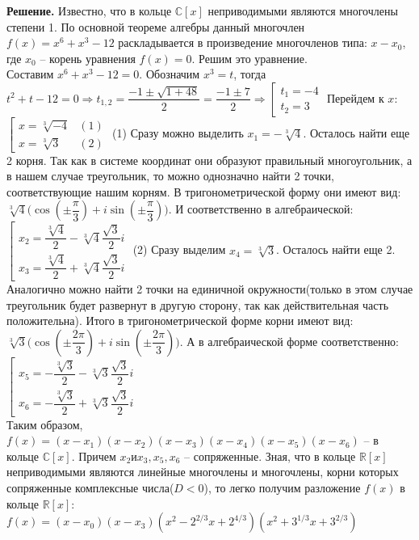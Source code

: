 \documentclass[a4paper, 12pt]{article}
\newcommand{\R}{\mathbb{R}}
\newcommand{\Co}{\mathbb{C}}
\begin{document}
\begin{spacing}{1}
\noindent \textbf{Решение.} Известно, что в кольце $\Co[x]$ неприводимыми являются многочлены степени 1. По основной теореме алгебры данный многочлен $f(x) = x^6 + x^3 - 12$ раскладывается в произведение многочленов типа: $x-x_0$, где $x_0$ -- корень уравнения $f(x) = 0$. Решим это уравнение. \\
Составим $x^6 + x^3 - 12 = 0$. Обозначим $x^3 = t$, тогда $t^2 + t - 12 = 0 \Rightarrow t_{1,2} = \dfrac{-1 \pm \sqrt{1 + 48}}{2} = \dfrac{-1 \pm 7}{2} \Rightarrow \left[\begin{array}{l|}
	t_1 = -4\\
	t_2 = 3
\end{array}\right.
$ Перейдем к $x$: $\left[\begin{array}{ll|}
	x = \sqrt[3]{-4} & (1)\\
	x = \sqrt[3]{3} & (2)
\end{array}\right.$ (1) Сразу можно выделить $x_1 = -\sqrt[3]{4}$. Осталось найти еще 2 корня. Так как в системе координат они образуют правильный многоугольник, а в нашем случае треугольник, то можно однозначно найти 2 точки, соответствующие нашим корням. В тригонометрической форму они имеют вид: $\sqrt[3]4\big(\cos(\pm\dfrac{\pi}{3})+i\sin(\pm\dfrac{\pi}{3})\big)$. И соответственно в алгебраической: $\left[\begin{array}{l|}
x_2 = \dfrac{\sqrt[3]4}{2} - \sqrt[3]4\dfrac{\sqrt3}{2}i\\[7pt]
x_3 = \dfrac{\sqrt[3]4}{2} + \sqrt[3]4\dfrac{\sqrt3}{2}i
\end{array}\right.$ (2) Сразу выделим $x_4 = \sqrt[3]{3}$. Осталось найти еще 2. Аналогично можно найти 2 точки на единичной окружности(только в этом случае треугольник будет развернут в другую сторону, так как действительная часть положительна). Итого в тригонометрической форме корни имеют вид: $\sqrt[3]3\big(\cos(\pm \dfrac{2\pi}{3}) + i\sin(\pm \dfrac{2\pi}{3})\big)$. А в алгебраической форме соответственно:$\left[\begin{array}{l}
x_5 = -\dfrac{\sqrt[3]3}{2} - \sqrt[3]3\dfrac{\sqrt3}{2}i\\[7pt]
x_6 = -\dfrac{\sqrt[3]3}{2} + \sqrt[3]3\dfrac{\sqrt3}{2}i
\end{array}\right.$ \\
Таким образом, $f(x) = (x-x_1)(x-x_2)(x-x_3)(x-x_4)(x-x_5)(x-x_6)$ -- в кольце $\Co[x]$. Причем $x_2 и x_3, x_5,x_6$ -- сопряженные. Зная, что в кольце $\R[x]$ неприводимыми являются линейные многочлены и многочлены, корни которых сопряженные комплексные числа($D < 0$), то легко получим разложение $f(x)$ в кольце $\R[x]$: $f(x) = (x - x_0)(x-x_3)(x^2 - 2^{2/3} x + 2^{4/3})(x^2 + 3^{1/3}x + 3^{2/3})$  







\end{spacing}
\end{document}
